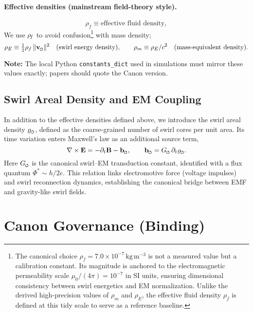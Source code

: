 \documentclass[11pt]{article}
\begin{document}
    \paragraph{Effective densities (mainstream field-theory style).}
    \[
        \rho_f \equiv \text{effective fluid density},
	\]
        We use $\rho_{\!f}$ to avoid confusion\footnote{The canonical choice
            $\rho_{\!f} = 7.0\times 10^{-7}\,\mathrm{kg\,m^{-3}}$
            is not a measured value but a calibration constant.
            Its magnitude is anchored to the electromagnetic permeability scale
            $\mu_0/(4\pi) = 10^{-7}$ in SI units, ensuring dimensional consistency
            between swirl energetics and EM normalization.
            Unlike the derived high-precision values of
            $\rho_{\!m}$ and $\rho_{\!E}$,
            the effective fluid density $\rho_{\!f}$ is defined
            at this tidy scale to serve as a reference baseline.}
            with mass density;
	\[
        \rho_E \equiv \tfrac12 \rho_f\, \vnorm^2\quad(\text{swirl energy density}),\qquad
        \rho_m \equiv \rho_E/c^2\quad(\text{mass-equivalent density}).
    \]

    \textbf{Note:} The local Python \texttt{constants\_dict} used in simulations must mirror these values exactly; papers should quote the Canon version.

    \subsection*{Swirl Areal Density and EM Coupling}

    In addition to the effective densities defined above, we introduce the swirl areal density
    \(\varrho_{\swirlarrow}\), defined as the coarse-grained number of swirl cores per unit area. Its time variation enters Maxwell’s law as an additional source term,
    \[
        \nabla \times \mathbf{E} = -\partial_t \mathbf{B} - \mathbf{b}_{\swirlarrow}, \qquad
        \mathbf{b}_{\swirlarrow} = G_{\swirlarrow}\,\partial_t \varrho_{\swirlarrow}.
    \]
    Here \(G_{\swirlarrow}\) is the canonical swirl--EM transduction constant, identified with a flux quantum \(\Phi^\ast \sim h/2e\). This relation links electromotive force (voltage impulses) and swirl reconnection dynamics, establishing the canonical bridge between EMF and gravity-like swirl fields.


    \section{Canon Governance (Binding)}
\end{document}
